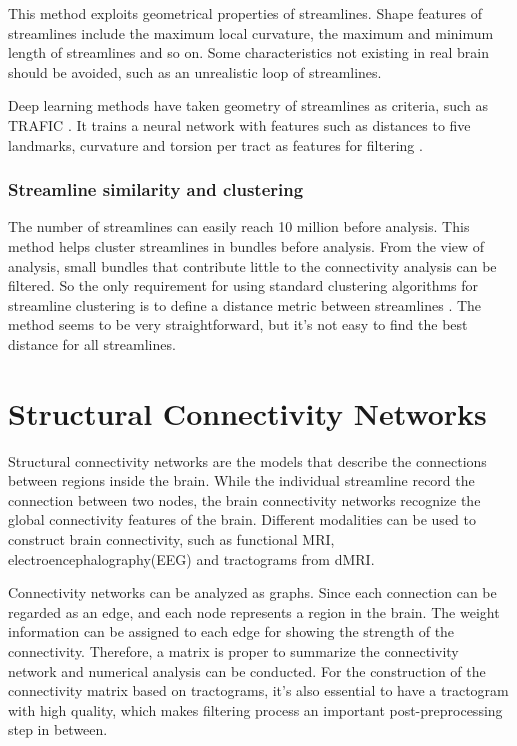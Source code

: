 This method exploits geometrical properties of streamlines.
Shape features of streamlines include the maximum local curvature, the maximum and minimum length of streamlines and so on. 
Some characteristics not existing in real brain should be avoided, such as an unrealistic loop of streamlines. 

Deep learning methods have taken geometry of streamlines as criteria, such as TRAFIC \cite*{lamTRAFICFiberTract2018}. 
It trains a neural network with features such as distances to five landmarks, curvature and torsion per tract as features for filtering \cite*{lamTRAFICFiberTract2018}.

\subsubsection{Streamline similarity and clustering}

The number of streamlines can easily reach 10 million before analysis. 
This method helps cluster streamlines in bundles before analysis. 
From the view of analysis, small bundles that contribute little to the connectivity analysis can be filtered. 
So the only requirement for using standard clustering algorithms for streamline clustering 
is to define a distance metric between streamlines \cite*[]{ozarslanAnisotropyFieldsScales2021}.
The method seems to be very straightforward, but it's not easy to find the best distance for all streamlines.



\section{Structural Connectivity Networks}
Structural connectivity networks are the models that describe the connections between regions inside the brain.
While the individual streamline record the connection between two nodes, the brain connectivity networks recognize
the global connectivity features of the brain. Different modalities can be used to construct brain connectivity, such as functional MRI,
electroencephalography(EEG) and tractograms from dMRI.

Connectivity networks can be analyzed as graphs. Since each connection can be regarded as an edge, and each node
represents a region in the brain. The weight information can be assigned to each edge for showing the strength of the connectivity.
Therefore, a matrix is proper to summarize the connectivity network and numerical analysis can be conducted.
For the construction of the connectivity matrix based on tractograms, it's also essential to have a tractogram with high quality,
which makes filtering process an important post-preprocessing step in between.
